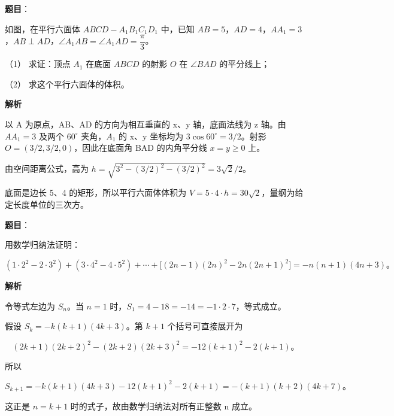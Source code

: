 \begin{answer}

\textbf{题目}：

如图，在平行六面体 $ABCD-A_1B_1C_1D_1$ 中，已知 $AB=5$，$AD=4$，$AA_1=3$，$AB\perp AD$，$\angle A_1AB=\angle A_1AD=\dfrac\pi3$。

（1） 求证：顶点 $A_1$ 在底面 $ABCD$ 的射影 $O$ 在 $\angle BAD$ 的平分线上；

（2） 求这个平行六面体的体积。
\nopagebreak[4]
\begin{center}\end{center}
\nopagebreak[4]
\textbf{解析}


以 A 为原点，AB、AD 的方向为相互垂直的 x、y 轴，底面法线为 z 轴。由 $AA_1=3$ 及两个 $60^\circ$ 夹角，$A_1$ 的 x、y 坐标均为 $3\cos60^\circ=3/2$。射影 $O=(3/2,3/2,0)$，因此在底面角 BAD 的内角平分线 $x=y\ge0$ 上。


由空间距离公式，高为 $h=\sqrt{3^2-(3/2)^2-(3/2)^2}=3\sqrt2/2$。

底面是边长 5、4 的矩形，所以平行六面体体积为 $V=5\cdot4\cdot h=30\sqrt2$，量纲为给定长度单位的三次方。



\end{answer}
\begin{answer}

\textbf{题目}：

用数学归纳法证明：

\nopagebreak[4]
\[
(1\cdot2^2-2\cdot3^2)+(3\cdot4^2-4\cdot5^2)+\cdots
+\bigl[(2n-1)(2n)^2-2n(2n+1)^2\bigr]
=-n(n+1)(4n+3)\text{。}
\]

\textbf{解析}

令等式左边为 $S_n$。当 $n=1$ 时，$S_1=4-18=-14=-1\cdot2\cdot7$，等式成立。

假设 $S_k=-k(k+1)(4k+3)$。第 $k+1$ 个括号可直接展开为

\nopagebreak[4]
\[
(2k+1)(2k+2)^2-(2k+2)(2k+3)^2
=-12(k+1)^2-2(k+1)\text{。}
\]

所以

\nopagebreak[4]
\[
S_{k+1}=-k(k+1)(4k+3)-12(k+1)^2-2(k+1)
=-(k+1)(k+2)(4k+7)\text{。}
\]

这正是 $n=k+1$ 时的式子，故由数学归纳法对所有正整数 n 成立。


\end{answer}
